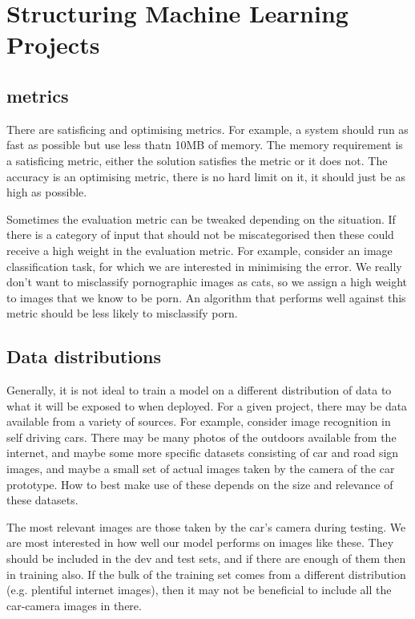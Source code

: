 \documentclass{article}
\begin{document}
\section{Structuring Machine Learning Projects}
\subsection{metrics}
There are satisficing and optimising metrics. For example, a system should run as fast as possible but use less thatn 10MB of memory. The memory requirement is a satisficing metric, either the solution satisfies the metric or it does not. The accuracy is an optimising metric, there is no hard limit on it, it should just be as high as possible.

Sometimes the evaluation metric can be tweaked depending on the situation. If there is a category of input that should not be miscategorised then these could receive a high weight in the evaluation metric. For example, consider an image classification task, for which we are interested in minimising the error. We really don't want to misclassify pornographic images as cats, so we assign a high weight to images that we know to be porn. An algorithm that performs well against this metric should be less likely to misclassify porn.

\subsection{Data distributions}

Generally, it is not ideal to train a model on a different distribution of data to what it will be exposed to when deployed. 
For a given project, there may be data available from a variety of sources. For example, consider image recognition in self driving cars. There may be many photos of the outdoors available from the internet, and maybe some more specific datasets consisting of car and road sign images, and maybe a small set of actual images taken by the camera of the car prototype. How to best make use of these depends on the size and relevance of these datasets.

The most relevant images are those taken by the car's camera during testing. We are most interested in how well our model performs on images like these. They should be included in the dev and test sets, and if there are enough of them then in training also. If the bulk of the training set comes from a different distribution (e.g. plentiful internet images), then it may not be beneficial to include all the car-camera images in there. 
\end{document}
